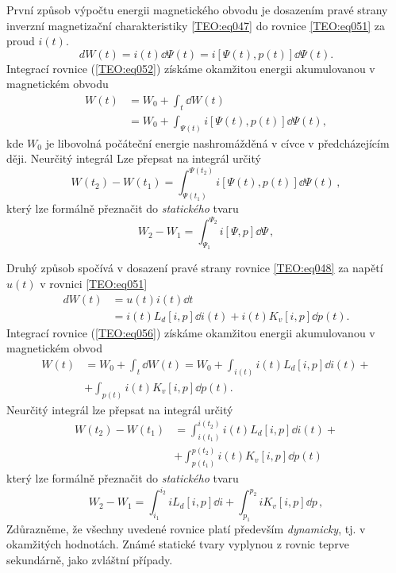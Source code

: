 {      První způsob výpočtu energii magnetického obvodu je dosazením pravé strany 
      inverzní magnetizační charakteristiky \ref{TEO:eq047} do rovnice \ref{TEO:eq051} za proud 
      \(i(t)\). 
      \begin{equation}\label{TEO:eq052}
        dW(t) = i(t)\dd{\Psi(t)} = i[\Psi(t), p(t)]\dd{\Psi(t)}.
      \end{equation}
      Integrací rovnice (\ref{TEO:eq052}) získáme okamžitou energii akumulovanou v magnetickém 
      obvodu
      \begin{align}\label{TEO:eq053}
        W(t) &= W_0 + \int_t\dd{W(t)}                              \nonumber \\
             &= W_0 + \int_{\Psi(t)}i[\Psi(t), p(t)]\dd{\Psi(t)},
      \end{align}
      kde \(W_0\) je libovolná počáteční energie nashromážděná v cívce v předcházejícím ději. 
      Neurčitý integrál Lze přepsat na integrál určitý
      \begin{equation}\label{TEO:eq054}
        \boxed{W(t_2) - W(t_1)  = \int_{\Psi(t_1)}^{\Psi(t_2)}i[\Psi(t), p(t)]\dd{\Psi(t)}}\,,
      \end{equation}
      který lze formálně přeznačit do \emph{statického} tvaru
      \begin{equation}\label{TEO:eq055}
        \boxed{W_2 - W_1  = \int_{\Psi_1}^{\Psi_2}i[\Psi, p]\dd{\Psi}}\,,
      \end{equation}
      
      Druhý způsob spočívá v dosazení pravé strany rovnice \ref{TEO:eq048} za napětí \(u(t)\) v 
      rovnici \ref{TEO:eq051}
      \begin{align}\label{TEO:eq056}
        dW(t) &= u(t)i(t)\dd{t}                                \nonumber \\
              &= i(t)L_d[i,p]\dd{i(t)} + i(t)K_v[i,p]\dd{p(t)}.
      \end{align}
      Integrací rovnice (\ref{TEO:eq056}) získáme okamžitou energii akumulovanou v magnetickém obvod
      \begin{align}\label{TEO:eq057}
        W(t) &= W_0 + \int_t\dd{W(t)}
              = W_0 + \int_{i(t)}i(t)L_d[i,p]\dd{i(t)} +       \nonumber \\
             &+ \int_{p(t)}i(t)K_v[i,p]\dd{p(t)}.
      \end{align}
      Neurčitý integrál lze přepsat na integrál určitý
      \begin{align}\label{TEO:eq058}
        W(t_2) - W(t_1)  
          &= \int_{i(t_1)}^{i(t_2)}i(t)L_d[i,p]\dd{i(t)} +      \nonumber \\
          &+ \int_{p(t_1)}^{p(t_2)}i(t)K_v[i,p]\dd{p(t)}
      \end{align}
      který lze formálně přeznačit do \emph{statického} tvaru
      \begin{equation}\label{TEO:eq059}
        \boxed{W_2 - W_1  = 
            \int_{i_1}^{i_2}iL_d[i,p]\dd{i} + \int_{p_1}^{p_2}iK_v[i,p]\dd{p}}\,,
      \end{equation}
      Zdůrazněme, že všechny uvedené rovnice platí především \emph{dynamicky}, tj. v okamžitých 
      hodnotách. Známé statické tvary vyplynou z rovnic teprve sekundárně, jako zvláštní případy. 

}

